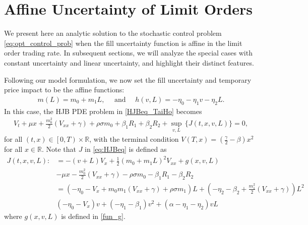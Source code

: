 \documentclass[12pt, letterpaper]{article}
\def\R{{\mathbb R}}        %
\numberwithin{equation}{section}
\numberwithin{theorem}{section}
\begin{document}
\section{Affine Uncertainty of Limit Orders}\label{sec:affine_unc}
We present here an analytic  solution to the stochastic  control problem \eqref{eq:opt_control_prob} when the fill uncertainty function is affine in the limit order trading rate.  In subsequent sections, we will analyze the  special cases with constant uncertainty and linear uncertainty, and highlight their distinct features.

Following our model formulation, we now  set the fill uncertainty and temporary price impact to be the affine functions:
\begin{align}\label{AFFINE}
m(L)=m_0+m_1L, \quad \text{ and } \quad  h(v,L)=-\eta_0-\eta_1 v -\eta_2 L. %
\end{align} 
In this case, the HJB PDE problem in \eqref{HJBeq_TaiHo}  becomes 
\begin{equation}\label{eq:HJBeq}
\begin{aligned}
V_t+\mu x+\frac{m_0^2}{2}(V_{xx}+\gamma)+\rho\sigma m_0+\beta_1R_1+\beta_2R_2+\underset{v,L}{\sup}\,\big\{J(t,x,v,L)\big\}=0,
\end{aligned}
\end{equation}
for all $(t,x)\in\left[0,T\right)\times\R$, with  the terminal condition $V(T,x)=\left(\frac{\gamma}{2}-\beta\right)x^2$ for all $x\in\R$. Note that $J$ in \eqref{eq:HJBeq}
 is defined as
\begin{equation}\label{eq:Jdefn}
\begin{aligned}
J(t,x,v,L):&=-(v+L)V_x+\frac{1}{2}(m_0+m_1L)^2V_{xx}+g(x,v,L)\\
&-\mu x-\frac{m_0^2}{2}(V_{xx}+\gamma)-\rho\sigma m_0-\beta_1R_1-\beta_2R_2\\
&=\left(-\eta_0-V_x +m_0m_1(V_{xx}+\gamma)+\rho \sigma m_1\right)L+\left(-\eta_2-\beta_2+\frac{m_1^2}{2}(V_{xx}+\gamma)\right)L^2 \\
&\left(-\eta_0-V_x\right) v+\left(-\eta_1-\beta_1 \right)v^2+\left(\alpha-\eta_1-\eta_2\right)vL
\end{aligned}
\end{equation}
where  $g(x,v,L)$ is defined in \eqref{fun_g}.
\end{document}
